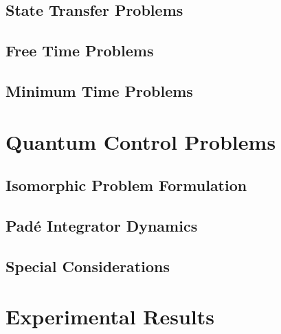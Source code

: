 \documentclass{article}
\begin{document}
\subsection{State Transfer Problems}

\subsection{Free Time Problems}

\subsection{Minimum Time Problems}

\newpage
\section{Quantum Control Problems}

\subsection{Isomorphic Problem Formulation}

\subsection{Pad\'e Integrator Dynamics}

\subsection{Special Considerations}

\newpage
\section{Experimental Results}
\end{document}
